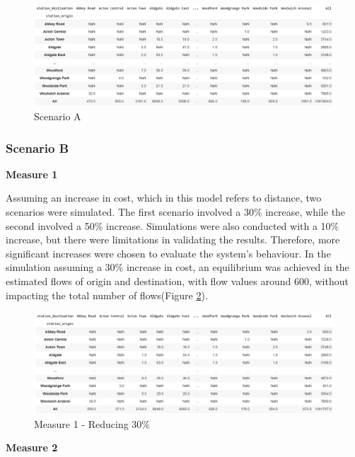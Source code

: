 \documentclass[10pt]{report}
\numberwithin{figure}{section}
\numberwithin{table}{section}
\begin{document}
    \begin{figure}[htp]
        \centering
        \includegraphics[width=16cm]{Image/Part2_OD4_scenario A.png}
        \caption{Scenario A}
        \label{fig:Part2_OD4_scenario A}
    \end{figure}
  

\subsubsection{Scenario B}

\textbf{Measure 1}

Assuming an increase in cost, which in this model refers to distance, two scenarios were simulated. The first scenario involved a 30\% increase, while the second involved a 50\% increase. Simulations were also conducted with a 10\% increase, but there were limitations in validating the results. Therefore, more significant increases were chosen to evaluate the system's behaviour. In the simulation assuming a 30\% increase in cost, an equilibrium was achieved in the estimated flows of origin and destination, with flow values around 600, without impacting the total number of flows(Figure \ref{fig:Part2_OD6_scenario B}).

    \begin{figure}[htp]
        \centering
        \includegraphics[width=16cm]{Image/Part2_OD6_scenario B.png}
        \caption{Measure 1 - Reducing 30\%}
        \label{fig:Part2_OD6_scenario B}
    \end{figure}

\textbf{Measure 2}    
\end{document}
